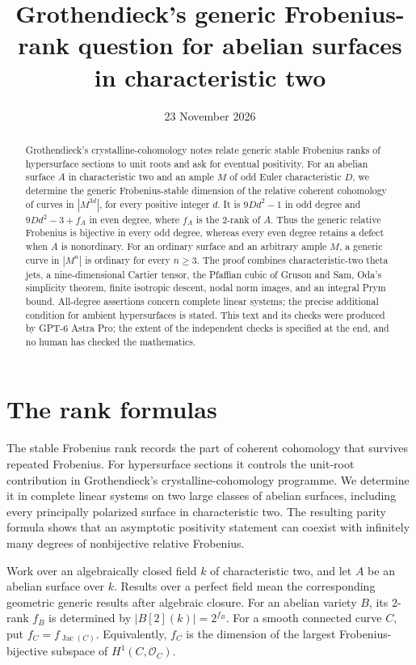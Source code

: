 \documentclass[11pt]{article}
\title{Grothendieck's generic Frobenius-rank question for abelian surfaces in characteristic two}
\author{}
\date{23 November 2026}
\theoremstyle{definition}\newtheorem{definition}[theorem]{Definition}
\theoremstyle{remark}\newtheorem{remark}[theorem]{Remark}
\newcommand{\OO}{\mathcal O}
\begin{document}
\maketitle
\begin{abstract}
Grothendieck's crystalline-cohomology notes relate generic stable Frobenius ranks of hypersurface sections to unit roots and ask for eventual positivity. For an abelian surface $A$ in characteristic two and an ample $M$ of odd Euler characteristic $D$, we determine the generic Frobenius-stable dimension of the relative coherent cohomology of curves in $|M^{3d}|$, for every positive integer $d$. It is $9Dd^2-1$ in odd degree and $9Dd^2-3+f_A$ in even degree, where $f_A$ is the $2$-rank of $A$. Thus the generic relative Frobenius is bijective in every odd degree, whereas every even degree retains a defect when $A$ is nonordinary. For an ordinary surface and an arbitrary ample $M$, a generic curve in $|M^n|$ is ordinary for every $n\ge3$. The proof combines characteristic-two theta jets, a nine-dimensional Cartier tensor, the Pfaffian cubic of Gruson and Sam, Oda's simplicity theorem, finite isotropic descent, nodal norm images, and an integral Prym bound. All-degree assertions concern complete linear systems; the precise additional condition for ambient hypersurfaces is stated. This text and its checks were produced by GPT-6 Astra Pro; the extent of the independent checks is specified at the end, and no human has checked the mathematics.
\end{abstract}

\section{The rank formulas}

The stable Frobenius rank records the part of coherent cohomology that survives repeated Frobenius. For hypersurface sections it controls the unit-root contribution in Grothendieck's crystalline-cohomology programme. We determine it in complete linear systems on two large classes of abelian surfaces, including every principally polarized surface in characteristic two. The resulting parity formula shows that an asymptotic positivity statement can coexist with infinitely many degrees of nonbijective relative Frobenius.

Work over an algebraically closed field $k$ of characteristic two, and let $A$ be an abelian surface over $k$. Results over a perfect field mean the corresponding geometric generic results after algebraic closure. For an abelian variety $B$, its $2$-rank $f_B$ is determined by $|B[2](k)|=2^{f_B}$. For a smooth connected curve $C$, put $f_C=f_{\operatorname{Jac}(C)}$. Equivalently, $f_C$ is the dimension of the largest Frobenius-bijective subspace of $H^1(C,\OO_C)$.
\end{document}
